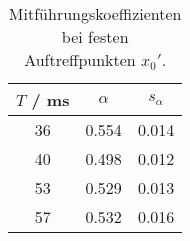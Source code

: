 \begin{table}[H]
\caption{Mitf\"uhrungskoeffizienten bei festen Auftreffpunkten $x_0'$. }
\begin{center}
\begin{tabular}{|c|c|c|}
  \hline
  $T$ / ms & $\alpha$ & $s_{\alpha}$ \\ \hline
  36 & 0.554 & 0.014 \\ \hline
  40 & 0.498 & 0.012 \\ \hline
  53 & 0.529 & 0.013 \\ \hline
  57 & 0.532 & 0.016 \\ \hline
\end{tabular}
\end{center}
\label{tab:T:alpha}
\end{table}
